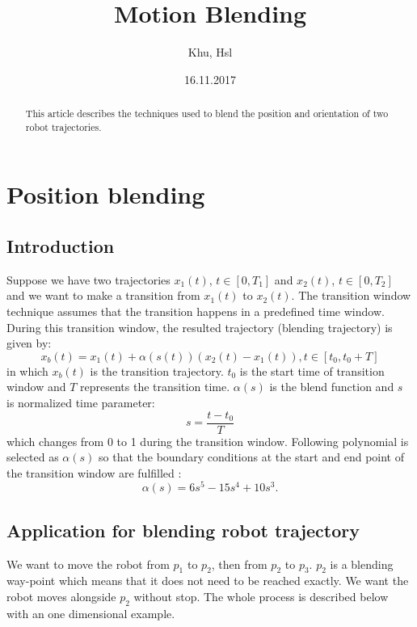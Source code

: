 \documentclass{amsart}
\theoremstyle{plain}
\numberwithin{equation}{section}
\begin{document}
\title[]{Motion Blending}
\author{
  Khu,
  Hsl
}
\date{16.11.2017}

\begin{abstract}
This article describes the techniques used to blend the position and orientation of two robot trajectories.
\end{abstract}
\maketitle

\section{Position blending}

\subsection{Introduction}

Suppose we have two trajectories $x_1(t)$, $t\in[0,T_1]$ and $x_2(t)$, $t\in[0,T_2]$ and we want to make a transition from $x_1(t)$ to $x_2(t)$. The transition window technique assumes that the transition happens in a predefined time window. During this transition window, the resulted trajectory (blending trajectory) is given by:
\begin{equation}
	x_b(t) = x_1(t) + \alpha(s(t))(x_2(t)-x_1(t)), t \in [t_0, t_0 + T]
\end{equation}
in which $x_b(t)$ is the transition trajectory. $t_0$ is the start time of transition window and $T$ represents the transition time. $\alpha(s)$ is the blend function and $s$ is normalized time parameter:
\begin{equation}
s = \frac{t - t_0}{T}
\label{eq:1}
\end{equation}
which changes from 0 to 1 during the transition window. Following polynomial is selected as $\alpha(s)$ so that the boundary conditions at the start and end point of the transition window are fulfilled \cite{lloyd1993trajectory}:
\begin{equation}
\alpha(s) = 6s^5 - 15s^4 + 10s^3.
\label{eq:2}
\end{equation}

\subsection{Application for blending robot trajectory}
We want to move the robot from $p_1$ to $p_2$, then from $p_2$ to $p_3$. $p_2$ is a blending way-point which means that it does not need to be reached exactly. We want the robot moves alongside $p_2$ without stop. The whole process is described below with an one dimensional example.
\end{document}
